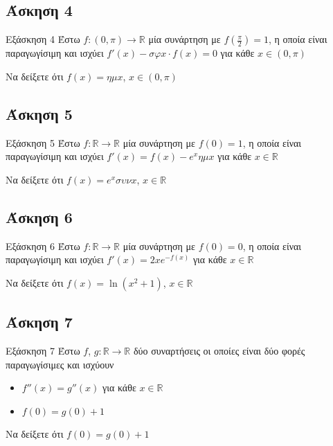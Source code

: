 \documentclass[greek]{beamer}
\begin{document}
\subsection{Άσκηση 4}
\begin{frame}[label=Άσκηση4]{Εξάσκηση 4}
 Έστω $f:(0,π)\to\mathbb{R}$ μία συνάρτηση με $f(\frac{π}{2})=1$, η οποία είναι παραγωγίσιμη και ισχύει $f'(x)-σφx\cdot f(x)=0$ για κάθε $x\in (0,π)$

 Να δείξετε ότι $f(x)=ημx$, $x\in (0,π)$

\end{frame}

\subsection{Άσκηση 5}
\begin{frame}[label=Άσκηση5]{Εξάσκηση 5}
 Έστω $f:\mathbb{R}\to\mathbb{R}$ μία συνάρτηση με $f(0)=1$, η οποία είναι παραγωγίσιμη και ισχύει $f'(x)=f(x)-e^xημx$ για κάθε $x\in\mathbb{R}$

 Να δείξετε ότι $f(x)=e^xσυνx$, $x\in\mathbb{R}$

\end{frame}

\subsection{Άσκηση 6}
\begin{frame}[label=Άσκηση6]{Εξάσκηση 6}
 Έστω $f:\mathbb{R}\to\mathbb{R}$ μία συνάρτηση με $f(0)=0$, η οποία είναι παραγωγίσιμη και ισχύει $f'(x)=2xe^{-f(x)}$ για κάθε $x\in\mathbb{R}$

 Να δείξετε ότι $f(x)=\ln (x^2+1)$, $x\in\mathbb{R}$

\end{frame}

\subsection{Άσκηση 7}
\begin{frame}[label=Άσκηση7]{Εξάσκηση 7}
 Έστω $f$, $g:\mathbb{R}\to\mathbb{R}$ δύο συναρτήσεις οι οποίες είναι δύο φορές παραγωγίσιμες και ισχύουν
 \begin{itemize}
   \item $f''(x)=g''(x)$ για κάθε $x\in\mathbb{R}$
   \item $f(0)=g(0)+1$
 \end{itemize}

 Να δείξετε ότι $f(0)=g(0)+1$

\end{frame}
\end{document}
